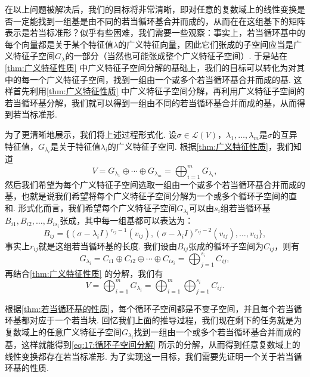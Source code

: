 在以上问题被解决后，我们的目标将非常清晰，即对任意的复数域上的线性变换是否一定能找到一组基是由不同的若当循环基合并而成的，从而在在这组基下的矩阵表示是若当标准形？似乎有些困难，我们需要一些观察：事实上，若当循环基中的每个向量都是关于某个特征值$\lambda$的广义特征向量，因此它们张成的子空间应当是广义特征子空间$G_\lambda$的一部分（当然也可能张成整个广义特征子空间）. 于是站在\autoref{thm:广义特征性质} 中广义特征子空间分解的基础上，我们的目标可以转化为对其中的每一个广义特征子空间，找到一组由一个或多个若当循环基合并而成的基. 这样首先利用\autoref{thm:广义特征性质} 中广义特征子空间分解，再利用广义特征子空间的若当循环基分解，我们就可以得到一组由不同的若当循环基合并而成的基，从而得到若当标准形.

为了更清晰地展示，我们将上述过程形式化. 设$\sigma\in\mathcal{L}(V)$，$\lambda_1,\ldots,\lambda_m$是$\sigma$的互异特征值，$G_{\lambda_i}$是关于特征值$\lambda_i$的广义特征子空间. 根据\autoref{thm:广义特征性质}，我们知道
\[V=G_{\lambda_1}\oplus\cdots\oplus G_{\lambda_m}=\bigoplus_{i=1}^m G_{\lambda_i},\]
然后我们希望为每个广义特征子空间选取一组由一个或多个若当循环基合并而成的基，也就是说我们希望将每个广义特征子空间分解为一个或多个循环子空间的直和. 形式化而言，我们希望每个广义特征子空间$G_{\lambda_i}$可以由$s_i$组若当循环基$B_{i1},B_{i2},\ldots,B_{is_i}$张成，其中每一组基都可以表达为：
\[B_{ij}=\{(\sigma-\lambda_iI)^{r_{ij}-1}(v_{ij}),(\sigma-\lambda_iI)^{r_{ij}-2}(v_{ij}),\ldots,v_{ij}\},\]
事实上$r_{ij}$就是这组若当循环基的长度. 我们设由$B_{ij}$张成的循环子空间为$C_{ij}$，则有
\[G_{\lambda_i}=C_{i1}\oplus C_{i2}\oplus\cdots\oplus C_{is_i}=\bigoplus_{j=1}^{s_i} C_{ij},\]
再结合\autoref{thm:广义特征性质} 的分解，我们有
\begin{equation} \label{eq:17:循环子空间分解}
    V=\bigoplus_{i=1}^m G_{\lambda_i}=\bigoplus_{i=1}^m\bigoplus_{j=1}^{s_i} C_{ij}.
\end{equation}

根据\autoref{thm:若当循环基的性质}，每个循环子空间都是不变子空间，并且每个若当循环基都对应于一个若当块. 回忆我们上面的推导过程，我们现在剩下的任务就是为复数域上的任意广义特征子空间$G_{\lambda_i}$找到一组由一个或多个若当循环基合并而成的基，这样就能得到\autoref{eq:17:循环子空间分解} 所示的分解，从而得到任意复数域上的线性变换都存在若当标准形. 为了实现这一目标，我们需要先证明一个关于若当循环基的性质.


